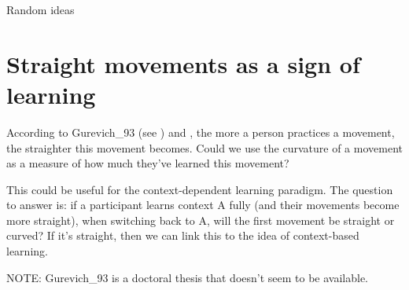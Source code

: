 \documentclass{report}
\begin{document}
\begin{chapter}{Random ideas}
\section{Straight movements as a sign of learning}
According to Gurevich\_93 (see \cite{Wolpert_Are_1995}) and \cite{Shadmehr_Adaptive_1994}, the more a person practices a movement, the straighter this movement becomes. Could we use the curvature of a movement as a measure of how much they've learned this movement?

This could be useful for the context-dependent learning paradigm. The question to answer is: if a participant learns context A fully (and their movements become more straight), when switching back to A, will the first movement be straight or curved? If it's straight, then we can link this to the idea of context-based learning.

NOTE: Gurevich\_93 is a doctoral thesis that doesn't seem to be available.
\end{chapter}
\end{document}
